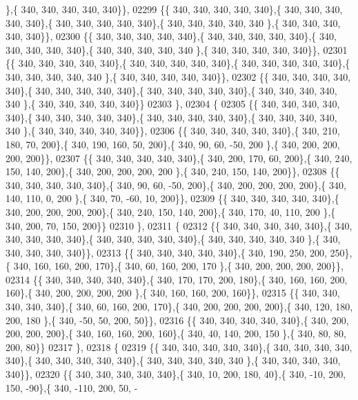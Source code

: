 \begin{DoxyCode}
      \},\{ 340, 340, 340, 340, 340\}\},
02299 \{\{ 340, 340, 340, 340, 340\},\{ 340, 340, 340, 340, 340\},\{ 340, 340, 340, 340, 340\},\{ 340, 340, 340, 340, 340
      \},\{ 340, 340, 340, 340, 340\}\},
02300 \{\{ 340, 340, 340, 340, 340\},\{ 340, 340, 340, 340, 340\},\{ 340, 340, 340, 340, 340\},\{ 340, 340, 340, 340, 340
      \},\{ 340, 340, 340, 340, 340\}\},
02301 \{\{ 340, 340, 340, 340, 340\},\{ 340, 340, 340, 340, 340\},\{ 340, 340, 340, 340, 340\},\{ 340, 340, 340, 340, 340
      \},\{ 340, 340, 340, 340, 340\}\},
02302 \{\{ 340, 340, 340, 340, 340\},\{ 340, 340, 340, 340, 340\},\{ 340, 340, 340, 340, 340\},\{ 340, 340, 340, 340, 340
      \},\{ 340, 340, 340, 340, 340\}\}
02303 \},
02304 \{
02305 \{\{ 340, 340, 340, 340, 340\},\{ 340, 340, 340, 340, 340\},\{ 340, 340, 340, 340, 340\},\{ 340, 340, 340, 340, 340
      \},\{ 340, 340, 340, 340, 340\}\},
02306 \{\{ 340, 340, 340, 340, 340\},\{ 340, 210, 180,  70, 200\},\{ 340, 190, 160,  50, 200\},\{ 340,  90,  60, -50, 200
      \},\{ 340, 200, 200, 200, 200\}\},
02307 \{\{ 340, 340, 340, 340, 340\},\{ 340, 200, 170,  60, 200\},\{ 340, 240, 150, 140, 200\},\{ 340, 200, 200, 200, 200
      \},\{ 340, 240, 150, 140, 200\}\},
02308 \{\{ 340, 340, 340, 340, 340\},\{ 340,  90,  60, -50, 200\},\{ 340, 200, 200, 200, 200\},\{ 340, 140, 110,   0, 200
      \},\{ 340,  70, -60,  10, 200\}\},
02309 \{\{ 340, 340, 340, 340, 340\},\{ 340, 200, 200, 200, 200\},\{ 340, 240, 150, 140, 200\},\{ 340, 170,  40, 110, 200
      \},\{ 340, 200,  70, 150, 200\}\}
02310 \},
02311 \{
02312 \{\{ 340, 340, 340, 340, 340\},\{ 340, 340, 340, 340, 340\},\{ 340, 340, 340, 340, 340\},\{ 340, 340, 340, 340, 340
      \},\{ 340, 340, 340, 340, 340\}\},
02313 \{\{ 340, 340, 340, 340, 340\},\{ 340, 190, 250, 200, 250\},\{ 340, 160, 160, 200, 170\},\{ 340,  60, 160, 200, 170
      \},\{ 340, 200, 200, 200, 200\}\},
02314 \{\{ 340, 340, 340, 340, 340\},\{ 340, 170, 170, 200, 180\},\{ 340, 160, 160, 200, 160\},\{ 340, 200, 200, 200, 200
      \},\{ 340, 160, 160, 200, 160\}\},
02315 \{\{ 340, 340, 340, 340, 340\},\{ 340,  60, 160, 200, 170\},\{ 340, 200, 200, 200, 200\},\{ 340, 120, 180, 200, 180
      \},\{ 340, -50,  50, 200,  50\}\},
02316 \{\{ 340, 340, 340, 340, 340\},\{ 340, 200, 200, 200, 200\},\{ 340, 160, 160, 200, 160\},\{ 340,  40, 140, 200, 150
      \},\{ 340,  80,  80, 200,  80\}\}
02317 \},
02318 \{
02319 \{\{ 340, 340, 340, 340, 340\},\{ 340, 340, 340, 340, 340\},\{ 340, 340, 340, 340, 340\},\{ 340, 340, 340, 340, 340
      \},\{ 340, 340, 340, 340, 340\}\},
02320 \{\{ 340, 340, 340, 340, 340\},\{ 340,  10, 200, 180,  40\},\{ 340, -10, 200, 150, -90\},\{ 340, -110, 200,  50, -

\end{DoxyCode}
